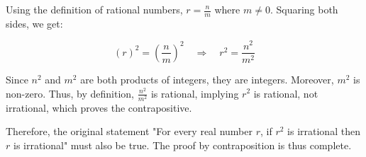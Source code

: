 \documentclass[12pt]{article}
\begin{document}
Using the definition of rational numbers, \( r = \frac{n}{m} \) where \( m \neq 0 \).  Squaring both sides, we get:

\[
(r)^2 = \left( \frac{n}{m} \right)^2 \quad \Rightarrow \quad r^2 = \frac{n^2}{m^2}
\]

Since \( n^2 \) and \( m^2 \) are both products of integers, they are integers. Moreover, \( m^2 \) is non-zero. Thus, by definition, \( \frac{n^2}{m^2} \) is rational, implying \( r^2 \) is rational, not irrational, which proves the contrapositive.

Therefore, the original statement "For every real number \( r \), if \( r^2 \) is irrational then \( r \) is irrational" must also be true. The proof by contraposition is thus complete.
\end{document}
